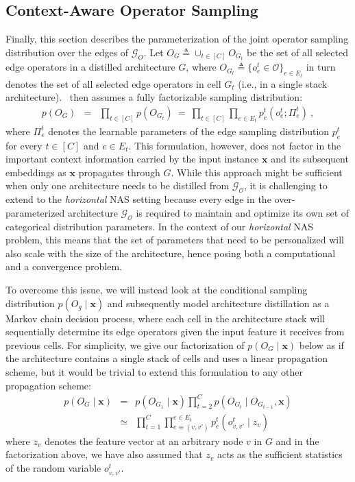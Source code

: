 \subsection{Context-Aware Operator Sampling}
\label{c4-subsec:opsampler}
Finally, this section describes the parameterization of the joint operator sampling distribution over the edges of $\mathcal{G}_O$. Let $O_G \triangleq \cup_{t\in[C]} O_{G_t}$ be the set of all selected edge operators in a distilled architecture $G$, where $O_{G_t} \triangleq \{o^t_e \in \mathcal{O}\}_{e\in E_t}$ in turn denotes the set of all selected edge operators in cell $G_t$ (i.e., in a single stack architecture).~\citet{hu2020} then assumes a fully factorizable sampling distribution:
\begin{eqnarray}
p(O_G) 
&=& \prod_{t\in[C]} p(O_{G_t}) 
\ = \ \prod_{t\in[C]} \prod_{e \in E_t} p^t_e(o^t_e; \Pi^t_e) \ , 
\end{eqnarray}
where $\Pi^t_e$ denotes the learnable parameters of the edge sampling distribution $p^t_e$ for every $t \in [C]$ and $e \in E_t$. This formulation, however, does not factor in the important context information carried by the input instance $\mathbf{x}$ and its subsequent embeddings as $\mathbf{x}$ propagates through $G$. While this approach might be sufficient when only one architecture needs to be distilled from $\mathcal{G_O}$, it is challenging to extend to the \emph{horizontal} NAS setting because every edge in the over-parameterized architecture $\mathcal{G_O}$ is required to maintain and optimize its own set of categorical distribution parameters. In the context of our \emph{horizontal} NAS problem, this means that the set of parameters that need to be personalized will also scale with the size of the architecture, hence posing both a computational and a convergence problem. 

To overcome this issue, we will instead look at the conditional sampling distribution $p(O_g \mid \mathbf{x})$ and subsequently model architecture distillation as a Markov chain decision process, where each cell in the architecture stack will sequentially determine its edge operators given the input feature it receives from previous cells. For simplicity, we give our factorization of $p(O_G \mid \mathbf{x})$ below as if the architecture contains a single stack of cells and uses a linear propagation scheme, but it would be trivial to extend this formulation to any other propagation scheme:
\begin{eqnarray}
p(O_G \mid \mathbf{x}) &=& p(O_{G_1} \mid \mathbf{x}) \prod_{t=2}^C p(O_{G_t} \mid O_{G_{t-1}}, \mathbf{x}) \nonumber \\
&\simeq& \prod_{t=1}^C \prod_{e\equiv(v,v')}^{e \in E_t} p^t_e\left(o^t_{v,v'} \mid z_{v}\right) 
\end{eqnarray}
where $z_{v}$ denotes the feature vector at an arbitrary node $v$ in $G$ and in the factorization above, we have also assumed that $z_{v}$ acts as the sufficient statistics of the random variable $o^t_{v,v'}$.

